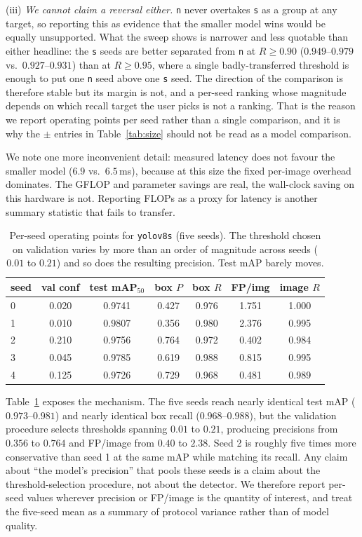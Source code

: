 (iii) \emph{We cannot claim a reversal either.} \texttt{n} never overtakes
\texttt{s} as a group at any target, so reporting this as evidence that the
smaller model wins would be equally unsupported. What the sweep shows is narrower
and less quotable than either headline: the \texttt{s} seeds are better separated
from \texttt{n} at $R\ge0.90$ ($0.949$--$0.979$ vs.\ $0.927$--$0.931$) than at
$R\ge0.95$, where a single badly-transferred threshold is enough to put one
\texttt{n} seed above one \texttt{s} seed. The direction of the comparison is
therefore stable but its margin is not, and a per-seed ranking whose magnitude
depends on which recall target the user picks is not a ranking. That is the reason
we report operating points per seed rather than a single comparison, and it is why
the $\pm$ entries in Table~\ref{tab:size} should not be read as a model
comparison.

We note one more inconvenient detail: measured latency does not favour the smaller
model ($6.9$ vs.\ $6.5$\,ms), because at this size the fixed per-image overhead
dominates. The GFLOP and parameter savings are real, the wall-clock saving on this
hardware is not. Reporting FLOPs as a proxy for latency is another summary
statistic that fails to transfer.

\begin{table}[t]
\centering
\small
\caption{Per-seed operating points for \texttt{yolov8s} (five seeds). The
threshold chosen on validation varies by more than an order of magnitude across
seeds ($0.01$ to $0.21$) and so does the resulting precision. Test mAP barely
moves.}
\label{tab:seed}
\begin{tabular}{lcccccc}
\toprule
seed & val conf & test mAP$_{50}$ & box $P$ & box $R$ & FP/img & image $R$ \\
\midrule
0 & 0.020 & 0.9741 & 0.427 & 0.976 & 1.751 & 1.000 \\
1 & 0.010 & 0.9807 & 0.356 & 0.980 & 2.376 & 0.995 \\
2 & 0.210 & 0.9756 & 0.764 & 0.972 & 0.402 & 0.984 \\
3 & 0.045 & 0.9785 & 0.619 & 0.988 & 0.815 & 0.995 \\
4 & 0.125 & 0.9726 & 0.729 & 0.968 & 0.481 & 0.989 \\
\bottomrule
\end{tabular}
\end{table}

Table~\ref{tab:seed} exposes the mechanism. The five seeds reach nearly identical
test mAP ($0.973$--$0.981$) and nearly identical box recall ($0.968$--$0.988$),
but the validation procedure selects thresholds spanning $0.01$ to $0.21$,
producing precisions from $0.356$ to $0.764$ and FP/image from $0.40$ to $2.38$.
Seed 2 is roughly five times more conservative than seed 1 at the same mAP while
matching its recall. Any claim about ``the model's precision'' that pools these
seeds is a claim about the threshold-selection procedure, not about the detector.
We therefore report per-seed values wherever precision or FP/image is the
quantity of interest, and treat the five-seed mean as a summary of protocol
variance rather than of model quality.

